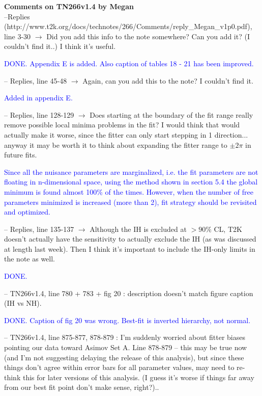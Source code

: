 \documentclass[final]{elsarticle}
\begin{document}
{\Large \textbf{Comments on TN266v1.4 by Megan}} \\


--Replies (http://www.t2k.org/docs/technotes/266/Comments/reply\_Megan\_v1p0.pdf), line 3-30
$\rightarrow$ Did you add this info to the note somewhere?  Can you add it?  (I couldn't find it..)  I think it's useful.

\textcolor{blue}{DONE. Appendix E is added. Also caption of tables 18 - 21 has been improved.}


-- Replies, line 45-48
$\rightarrow$ Again, can you add this to the note? I couldn't find it.

\textcolor{blue}{Added in appendix E.}

-- Replies, line 128-129
$\rightarrow$ Does starting at the boundary of the fit range really remove possible
local minima problems in the fit?  I would think that would actually make it
worse, since the fitter can only start stepping in 1 direction... anyway it
may be worth it to think about expanding the fitter range to $\pm 2 \pi$ in future fits.

\textcolor{blue}{Since all the nuisance parameters are marginalized, i.e. the fit parameters are not
floating in n-dimensional space, using the method shown in section 5.4
the global minimum is found almost 100\% of the times.
However, when the number of free parameters minimized is increased (more than 2), 
fit strategy should be revisited and optimized.}

-- Replies, line 135-137
$\rightarrow$ Although the IH is excluded at $>90\%$ CL, T2K doesn't actually
have the sensitivity to actually exclude the IH (as was discussed at length last week). 
Then I think it's important to include the IH-only limits in the note as well.

\textcolor{blue}{DONE.}

-- TN266v1.4, line 780 + 783 + fig 20 : description doesn't match figure caption (IH vs NH).

\textcolor{blue}{DONE. Caption of fig 20 was wrong. Best-fit is inverted hierarchy, not normal. }

-- TN266v1.4, line 875-877, 878-879 : I'm suddenly worried about fitter biases pointing
our data toward Asimov Set A.  Line 878-879 -- this may be true now (and I'm not suggesting
delaying the release of this analysis), but since these things don't agree within error bars for
all parameter values, may need to re-think this for later versions of this analysis.
(I guess it's worse if things far away from our best fit point don't make sense, right?)..
\end{document}
